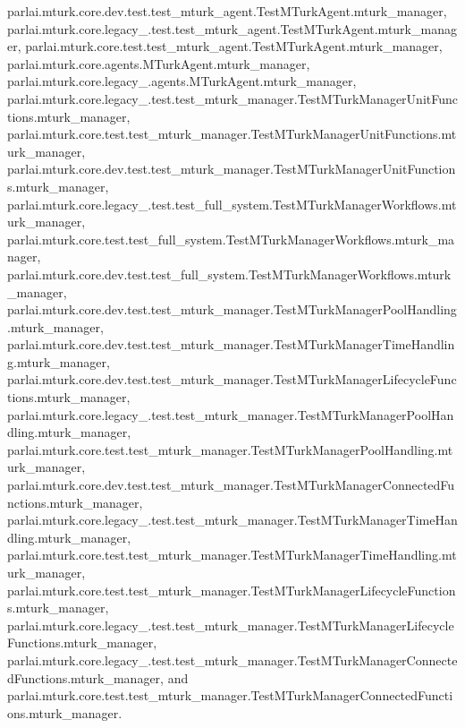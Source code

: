 parlai.\+mturk.\+core.\+dev.\+test.\+test\+\_\+mturk\+\_\+agent.\+Test\+M\+Turk\+Agent.\+mturk\+\_\+manager, parlai.\+mturk.\+core.\+legacy\+\_.\+test.\+test\+\_\+mturk\+\_\+agent.\+Test\+M\+Turk\+Agent.\+mturk\+\_\+manager, parlai.\+mturk.\+core.\+test.\+test\+\_\+mturk\+\_\+agent.\+Test\+M\+Turk\+Agent.\+mturk\+\_\+manager, parlai.\+mturk.\+core.\+agents.\+M\+Turk\+Agent.\+mturk\+\_\+manager, parlai.\+mturk.\+core.\+legacy\+\_.\+agents.\+M\+Turk\+Agent.\+mturk\+\_\+manager, parlai.\+mturk.\+core.\+legacy\+\_.\+test.\+test\+\_\+mturk\+\_\+manager.\+Test\+M\+Turk\+Manager\+Unit\+Functions.\+mturk\+\_\+manager, parlai.\+mturk.\+core.\+test.\+test\+\_\+mturk\+\_\+manager.\+Test\+M\+Turk\+Manager\+Unit\+Functions.\+mturk\+\_\+manager, parlai.\+mturk.\+core.\+dev.\+test.\+test\+\_\+mturk\+\_\+manager.\+Test\+M\+Turk\+Manager\+Unit\+Functions.\+mturk\+\_\+manager, parlai.\+mturk.\+core.\+legacy\+\_.\+test.\+test\+\_\+full\+\_\+system.\+Test\+M\+Turk\+Manager\+Workflows.\+mturk\+\_\+manager, parlai.\+mturk.\+core.\+test.\+test\+\_\+full\+\_\+system.\+Test\+M\+Turk\+Manager\+Workflows.\+mturk\+\_\+manager, parlai.\+mturk.\+core.\+dev.\+test.\+test\+\_\+full\+\_\+system.\+Test\+M\+Turk\+Manager\+Workflows.\+mturk\+\_\+manager, parlai.\+mturk.\+core.\+dev.\+test.\+test\+\_\+mturk\+\_\+manager.\+Test\+M\+Turk\+Manager\+Pool\+Handling.\+mturk\+\_\+manager, parlai.\+mturk.\+core.\+dev.\+test.\+test\+\_\+mturk\+\_\+manager.\+Test\+M\+Turk\+Manager\+Time\+Handling.\+mturk\+\_\+manager, parlai.\+mturk.\+core.\+dev.\+test.\+test\+\_\+mturk\+\_\+manager.\+Test\+M\+Turk\+Manager\+Lifecycle\+Functions.\+mturk\+\_\+manager, parlai.\+mturk.\+core.\+legacy\+\_.\+test.\+test\+\_\+mturk\+\_\+manager.\+Test\+M\+Turk\+Manager\+Pool\+Handling.\+mturk\+\_\+manager, parlai.\+mturk.\+core.\+test.\+test\+\_\+mturk\+\_\+manager.\+Test\+M\+Turk\+Manager\+Pool\+Handling.\+mturk\+\_\+manager, parlai.\+mturk.\+core.\+dev.\+test.\+test\+\_\+mturk\+\_\+manager.\+Test\+M\+Turk\+Manager\+Connected\+Functions.\+mturk\+\_\+manager, parlai.\+mturk.\+core.\+legacy\+\_.\+test.\+test\+\_\+mturk\+\_\+manager.\+Test\+M\+Turk\+Manager\+Time\+Handling.\+mturk\+\_\+manager, parlai.\+mturk.\+core.\+test.\+test\+\_\+mturk\+\_\+manager.\+Test\+M\+Turk\+Manager\+Time\+Handling.\+mturk\+\_\+manager, parlai.\+mturk.\+core.\+test.\+test\+\_\+mturk\+\_\+manager.\+Test\+M\+Turk\+Manager\+Lifecycle\+Functions.\+mturk\+\_\+manager, parlai.\+mturk.\+core.\+legacy\+\_.\+test.\+test\+\_\+mturk\+\_\+manager.\+Test\+M\+Turk\+Manager\+Lifecycle\+Functions.\+mturk\+\_\+manager, parlai.\+mturk.\+core.\+legacy\+\_.\+test.\+test\+\_\+mturk\+\_\+manager.\+Test\+M\+Turk\+Manager\+Connected\+Functions.\+mturk\+\_\+manager, and parlai.\+mturk.\+core.\+test.\+test\+\_\+mturk\+\_\+manager.\+Test\+M\+Turk\+Manager\+Connected\+Functions.\+mturk\+\_\+manager.




